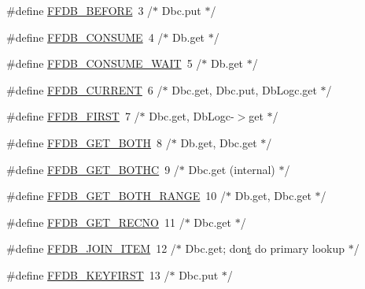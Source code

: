 \begin{DoxyCompactItemize}
\#define \mbox{\hyperlink{adat-devel_2other__libs_2filedb_2filehash_2ffdb__db_8h_a56cd20a510bd69d2078fe582e1132926}{F\+F\+D\+B\+\_\+\+B\+E\+F\+O\+RE}}~3	/$\ast$ Dbc.\+put $\ast$/
\item 
\#define \mbox{\hyperlink{adat-devel_2other__libs_2filedb_2filehash_2ffdb__db_8h_a53a12087e6dc78b7f19fb480a9f57c1f}{F\+F\+D\+B\+\_\+\+C\+O\+N\+S\+U\+ME}}~4	/$\ast$ Db.\+get $\ast$/
\item 
\#define \mbox{\hyperlink{adat-devel_2other__libs_2filedb_2filehash_2ffdb__db_8h_a73f35a2978e0e759ec815196346b9b09}{F\+F\+D\+B\+\_\+\+C\+O\+N\+S\+U\+M\+E\+\_\+\+W\+A\+IT}}~5	/$\ast$ Db.\+get $\ast$/
\item 
\#define \mbox{\hyperlink{adat-devel_2other__libs_2filedb_2filehash_2ffdb__db_8h_ab3994f0238e8f7b3c588549ec718cc00}{F\+F\+D\+B\+\_\+\+C\+U\+R\+R\+E\+NT}}~6	/$\ast$ Dbc.\+get, Dbc.\+put, Db\+Logc.\+get $\ast$/
\item 
\#define \mbox{\hyperlink{adat-devel_2other__libs_2filedb_2filehash_2ffdb__db_8h_ae32f5b1d1fb3d6c588a5e731938e1d22}{F\+F\+D\+B\+\_\+\+F\+I\+R\+ST}}~7	/$\ast$ Dbc.\+get, Db\+Logc-\/$>$get $\ast$/
\item 
\#define \mbox{\hyperlink{adat-devel_2other__libs_2filedb_2filehash_2ffdb__db_8h_a1e55b4f21b6fd5f9d23aba4c17d7f355}{F\+F\+D\+B\+\_\+\+G\+E\+T\+\_\+\+B\+O\+TH}}~8	/$\ast$ Db.\+get, Dbc.\+get $\ast$/
\item 
\#define \mbox{\hyperlink{adat-devel_2other__libs_2filedb_2filehash_2ffdb__db_8h_a0f4b88eaf1f61b10cf35562694a6d92b}{F\+F\+D\+B\+\_\+\+G\+E\+T\+\_\+\+B\+O\+T\+HC}}~9	/$\ast$ Dbc.\+get (internal) $\ast$/
\item 
\#define \mbox{\hyperlink{adat-devel_2other__libs_2filedb_2filehash_2ffdb__db_8h_a62a1aa9e27559adcc928d10ac3afc087}{F\+F\+D\+B\+\_\+\+G\+E\+T\+\_\+\+B\+O\+T\+H\+\_\+\+R\+A\+N\+GE}}~10	/$\ast$ Db.\+get, Dbc.\+get $\ast$/
\item 
\#define \mbox{\hyperlink{adat-devel_2other__libs_2filedb_2filehash_2ffdb__db_8h_a26a647e8d6dd6a90c80a5cf8e72e3fef}{F\+F\+D\+B\+\_\+\+G\+E\+T\+\_\+\+R\+E\+C\+NO}}~11	/$\ast$ Dbc.\+get $\ast$/
\item 
\#define \mbox{\hyperlink{adat-devel_2other__libs_2filedb_2filehash_2ffdb__db_8h_a384b06b14d65abd9bed09e70f64b48c3}{F\+F\+D\+B\+\_\+\+J\+O\+I\+N\+\_\+\+I\+T\+EM}}~12	/$\ast$ Dbc.\+get; don\textquotesingle{}\mbox{\hyperlink{adat__devel_2lib_2hadron_2hadron__timeslice_8cc_ac310d9181e916ba43604099aee272c71}{t}} do primary lookup $\ast$/
\item 
\#define \mbox{\hyperlink{adat-devel_2other__libs_2filedb_2filehash_2ffdb__db_8h_aa96acb1d3a1d52c48d4af0cd25092d9c}{F\+F\+D\+B\+\_\+\+K\+E\+Y\+F\+I\+R\+ST}}~13	/$\ast$ Dbc.\+put $\ast$/

\end{DoxyCompactItemize}
